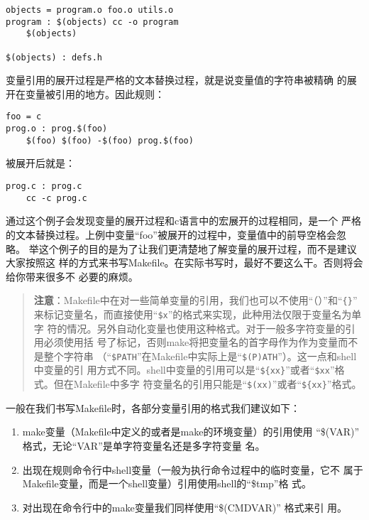 \begin{Verbatim}[]
objects = program.o foo.o utils.o
program : $(objects) cc -o program
    $(objects)

$(objects) : defs.h
\end{Verbatim}

\noindent 变量引用的展开过程是严格的文本替换过程，就是说变量值的字符串被精确
的展开在变量被引用的地方。因此规则：

\begin{Verbatim}[]
foo = c
prog.o : prog.$(foo)
    $(foo) $(foo) -$(foo) prog.$(foo)
\end{Verbatim}

\noindent 被展开后就是：

\begin{Verbatim}[]
prog.c : prog.c
    cc -c prog.c
\end{Verbatim}

\noindent 通过这个例子会发现变量的展开过程和c语言中的宏展开的过程相同，是一个
严格的文本替换过程。上例中变量“foo”被展开的过程中，变量值中的前导空格会忽略。
举这个例子的目的是为了让我们更清楚地了解变量的展开过程，而不是建议大家按照这
样的方式来书写Makefile。在实际书写时，最好不要这么干。否则将会给你带来很多不
必要的麻烦。


\begin{quote}\kaishu
\textbf{注意}：Makefile中在对一些简单变量的引用，我们也可以不使用“（）”和“\verb"{}"”
来标记变量名，而直接使用“\verb"$x"”的格式来实现，此种用法仅限于变量名为单字
符的情况。另外自动化变量也使用这种格式。对于一般多字符变量的引用必须使用括
号了标记，否则make将把变量名的首字母作为作为变量而不是整个字符串
（“\verb"$PATH"”在Makefile中实际上是“\verb"$(P)ATH"”）。这一点和shell中变量的引
用方式不同。shell中变量的引用可以是“\verb"${xx}"”或者“\verb"$xx"”格式。但在Makefile中多字
符变量名的引用只能是“\verb"$(xx)"”或者“\verb"${xx}"”格式。
\end{quote}

一般在我们书写Makefile时，各部分变量引用的格式我们建议如下：

\begin{enumerate}
\itemsep=4pt \parskip=0pt
  \item make变量（Makefile中定义的或者是make的环境变量）的引用使用
      “\$(VAR)” 格式，无论“VAR”是单字符变量名还是多字符变量
      名。
  \item  出现在规则命令行中shell变量（一般为执行命令过程中的临时变量，它不
      属于Makefile变量，而是一个shell变量）引用使用shell的“\$tmp”格
      式。
  \item 对出现在命令行中的make变量我们同样使用“\$(CMDVAR)” 格式来引
      用。

\end{enumerate}

